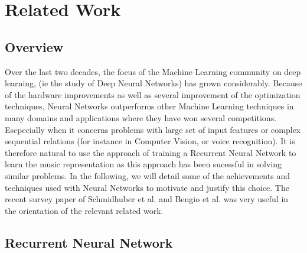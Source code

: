 
\chapter{Related Work} %

\label{Chapter 1} %




\section{Overview}

Over the last two decades, the focus of the Machine Learning community on deep learning, (ie the study of Deep Neural Networks) has grown considerably. Because of the hardware improvements as well as several improvement of the optimization techniques, Neural Networks outperforms other Machine Learning techniques in many domains and applications where they have won several competitions. Escpecially when it concerns problems with large set of input features or complex sequential relations (for instance in Computer Vision, or voice recognition). It is therefore natural to use the approach of training a Recurrent Neural Network to learn the music representation as this approach has been sucessful in solving similar problems. In the following, we will detail some of the achievements and techniques used with Neural Networks to motivate and justify this choice. The recent survey paper of Schmidhuber et al. \cite{schmidhuber2014deep} and Bengio et al.\cite{bengio2013advances} was very useful in the orientation of the relevant related work. 

\newpage
\section{Recurrent Neural Network}

